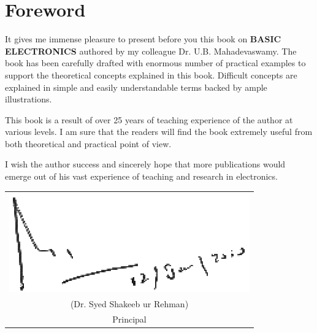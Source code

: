 \chapter*{Foreword}

\thispagestyle{empty}

It gives me immense pleasure to present before you this book on {\bf BASIC ELECTRONICS} authored by my colleague Dr. U.B. Mahadevaswamy. The book has been carefully drafted with enormous number of practical examples to support the theoretical concepts explained in this book. Difficult concepts are explained in simple and easily understandable terms backed by ample illustrations.

This book is a result of over 25 years of teaching experience of the author at various levels. I am sure that the readers will find the book extremely useful from both theoretical and practical point of view.

I wish the author success and sincerely hope that more publications would emerge out of his vast experience of teaching and research in electronics.

\vskip 1.5cm

\begin{flushright}
\begin{tabular}{c}
\includegraphics[scale=.9]{signature.eps}\\[5pt]
(Dr. Syed Shakeeb ur Rehman)\\[3pt]
Principal
\end{tabular}
\end{flushright}
